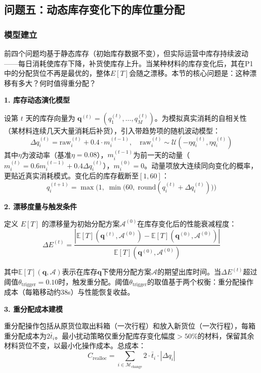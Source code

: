 \documentclass[a4paper]{cumcmthesis}
\newcommand{\E}[1]{\mathbb{E}\left[#1\right]}
\begin{document}
\subsection{问题五：动态库存变化下的库位重分配}

\FloatBarrier\subsubsection{模型建立}

前四个问题均基于静态库存（初始库存数据不变），但实际运营中库存持续波动——每日消耗使库存下降，补货使库存上升。当某种材料的库存变化后，其在P1中的分配货位不再是最优的，整体$E[T]$会随之漂移。本节的核心问题是：这种漂移有多大？何时值得重分配？

\textbf{1. 库存动态演化模型}

设第 $t$ 天的库存向量为 $\mathbf{q}^{(t)}=(q_1^{(t)},\dots,q_M^{(t)})$。为模拟真实消耗的自相关性（某材料连续几天大量消耗后补货），引入带趋势项的随机波动模型：
\begin{equation}
\Delta q_i^{(t)}=\mathrm{raw}_{i}^{(t)}+0.4\cdot m_i^{(t-1)},\quad \mathrm{raw}_i^{(t)}\sim\mathcal{U}(-\eta q_i^{(t)},\eta q_i^{(t)})
\end{equation}
其中$\eta$为波动率（基准$\eta=0.08$），$m_i^{(t-1)}$为前一天的动量（$m_i^{(t)}=0.6m_i^{(t-1)}+0.4\Delta q_i^{(t)}$），$m_i^{(0)}=0$。动量项放大连续同向变化的概率，更贴近真实消耗模式。变化后的库存截断至$[1,60]$：
\begin{equation}
q_i^{(t+1)}=\max\big(1,\; \min\big(60,\; \text{round}(q_i^{(t)}+\Delta q_i^{(t)})\big)\big)
\end{equation}

\textbf{2. 漂移度量与触发条件}

定义 $E[T]$ 的漂移量为初始分配方案$\mathcal{A}^{(0)}$在库存变化后的性能衰减程度：
\begin{equation}
\Delta E^{(t)}=\frac{|\E{T}(\mathbf{q}^{(t)},\mathcal{A}^{(0)})-\E{T}(\mathbf{q}^{(0)},\mathcal{A}^{(0)})|}{\E{T}(\mathbf{q}^{(0)},\mathcal{A}^{(0)})}
\end{equation}

其中$\E{T}(\mathbf{q},\mathcal{A})$表示在库存$\mathbf{q}$下使用分配方案$\mathcal{A}$的期望出库时间。当$\Delta E^{(t)}$超过阈值$\theta_{\text{trigger}}=0.10$时，触发重分配。阈值$\theta_{\text{trigger}}$的取值基于两个权衡：重分配操作成本（每箱移动约38s）与性能恢复收益。

\textbf{3. 重分配成本建模}

重分配操作包括从原货位取出料箱（一次行程）和放入新货位（一次行程），每箱重分配成本为$2\bar{t}_i$。最小扰动策略仅重分配库存变化幅度$>50\%$的材料，保留其余材料货位不变，以最小化操作成本。总成本：
\begin{equation}
C_{\text{realloc}}=\sum_{i\in\mathcal{M}_{\text{change}}} 2\cdot\bar{t}_i\cdot|\Delta q_i|
\end{equation}
\end{document}
